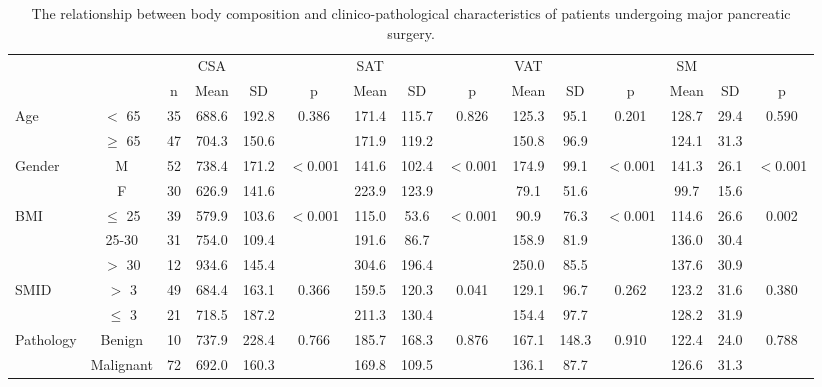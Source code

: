 \begin{sidewaystable}[p]
	\caption{The relationship between body composition and clinico-pathological characteristics of patients undergoing major pancreatic surgery.}
	\label{table:bc_clinical_old}
	\centering
	\begin{tabular}{l c c | c c c | c c c | c c c | c c c}
		          &           &    & CSA   &       &          & SAT   &       &          & VAT   &       &          & SM    &      &  \\
		          &           & n  & Mean  & SD    & p        & Mean  & SD    & p        & Mean  & SD    & p        & Mean  & SD   & p        \\ \hline
		Age       & $<$ 65    & 35 & 688.6 & 192.8 & 0.386    & 171.4 & 115.7 & 0.826    & 125.3 & 95.1  & 0.201    & 128.7 & 29.4 & 0.590    \\
		          & $\geq$ 65 & 47 & 704.3 & 150.6 &          & 171.9 & 119.2 &          & 150.8 & 96.9  &          & 124.1 & 31.3 &  \\
		Gender    & M         & 52 & 738.4 & 171.2 & $<$0.001 & 141.6 & 102.4 & $<$0.001 & 174.9 & 99.1  & $<$0.001 & 141.3 & 26.1 & $<$0.001 \\
		          & F         & 30 & 626.9 & 141.6 &          & 223.9 & 123.9 &          & 79.1  & 51.6  &          & 99.7  & 15.6 &  \\
		BMI       & $\leq$ 25 & 39 & 579.9 & 103.6 & $<$0.001 & 115.0 & 53.6  & $<$0.001 & 90.9  & 76.3  & $<$0.001 & 114.6 & 26.6 & 0.002    \\
		          & 25-30     & 31 & 754.0 & 109.4 &          & 191.6 & 86.7  &          & 158.9 & 81.9  &          & 136.0 & 30.4 &  \\
		          & $>$ 30    & 12 & 934.6 & 145.4 &          & 304.6 & 196.4 &          & 250.0 & 85.5  &          & 137.6 & 30.9 &  \\
		SMID      & $>$ 3     & 49 & 684.4 & 163.1 & 0.366    & 159.5 & 120.3 & 0.041    & 129.1 & 96.7  & 0.262    & 123.2 & 31.6 & 0.380    \\
		          & $\leq$ 3  & 21 & 718.5 & 187.2 &          & 211.3 & 130.4 &          & 154.4 & 97.7  &          & 128.2 & 31.9 &  \\
		Pathology & Benign    & 10 & 737.9 & 228.4 & 0.766    & 185.7 & 168.3 & 0.876    & 167.1 & 148.3 & 0.910    & 122.4 & 24.0 & 0.788    \\
		          & Malignant & 72 & 692.0 & 160.3 &          & 169.8 & 109.5 &          & 136.1 & 87.7  &          & 126.6 & 31.3 &  \\

\end{tabular}
\end{sidewaystable}
